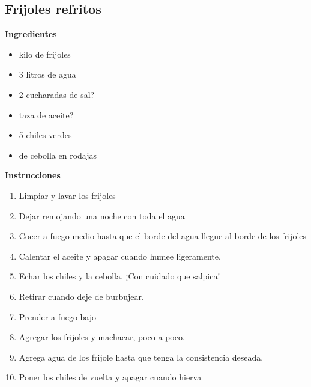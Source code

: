 \subsection{Frijoles refritos}
\label{sec:frijoles-refritos}

\textbf{Ingredientes}
\begin{itemize}
\item {} kilo de frijoles
\item 3 litros de agua
\item 2 cucharadas de sal?
\item {} taza de aceite?
\item 5 chiles verdes
\item {} de cebolla en rodajas
\end{itemize}

\textbf{Instrucciones}
\begin{enumerate}
\item Limpiar y lavar los frijoles
\item Dejar remojando una noche con toda el agua
\item Cocer a fuego medio hasta que el borde del agua llegue al borde de los frijoles
\item Calentar el aceite y apagar cuando humee ligeramente.
\item Echar los chiles y la cebolla. ¡Con cuidado que salpica!
\item Retirar cuando deje de burbujear.
\item Prender a fuego bajo
\item Agregar los frijoles y machacar, poco a poco.
\item Agrega agua de los frijole hasta que tenga la consistencia deseada.
\item Poner los chiles de vuelta y apagar cuando hierva  
\end{enumerate}
